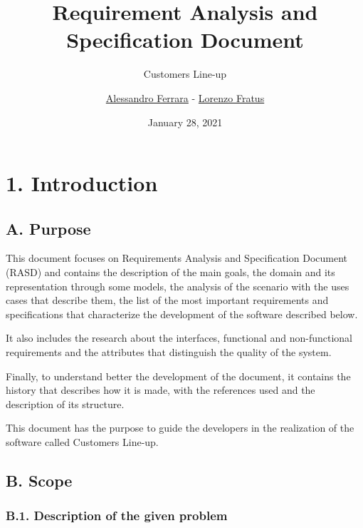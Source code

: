 
\usepackage{clipboard}
\usepackage{listings}
\usepackage{assets/rasd/alloy/alloy-style}
\graphicspath{ {assets/rasd/} }

\title{Requirement Analysis and\\Specification Document}
\subtitle{Customers Line-up}
\author{\href{https://github.com/ferrohd}{Alessandro Ferrara} -
\href{https://github.com/lorenzofratus}{Lorenzo Fratus}}
\date{January 28, 2021}



\maketitle

\tableofcontents

\chapter{1. Introduction}

\section{A. Purpose}

This document focuses on Requirements Analysis and Specification
Document (RASD) and contains the description of the main goals, the domain and its representation through some models, the analysis of the scenario with the uses cases that describe them, the list of the most important requirements and specifications that characterize the development of the software described below.

It also includes the research about the interfaces, functional and non-functional requirements and the attributes that distinguish the quality of the system.

Finally, to understand better the development of the document, it contains the history that describes how it is made, with the references used and the description of its structure.

This document has the purpose to guide the developers in the realization of the software called Customers Line-up.

\section{B. Scope}

\subsection{B.1. Description of the given problem}

